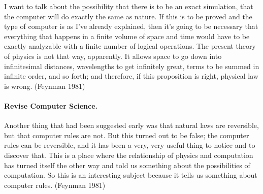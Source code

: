 \documentclass{article}
\newcommand{\jc}[1]{\fbox{Jacques says:} \textbf{#1}}
\begin{document}

I want to talk about the possibility that there is to be an exact
simulation, that the computer will do exactly the same as nature. If
this is to be proved and the type of computer is as I've already
explained, then it's going to be necessary that everything that
happens in a finite volume of space and time would have to be exactly
analyzable with a finite number of logical operations. The present
theory of physics is not that way, apparently. It allows space to go
down into infinitesimal distances, wavelengths to get infinitely
great, terms to be summed in infinite order, and so forth; and
therefore, if this proposition is right, physical law is wrong.
(Feynman 1981)


\paragraph*{Revise Computer Science.}

Another thing that had been suggested early was that natural laws are
reversible, but that computer rules are not. But this turned out to be
false; the computer rules can be reversible, and it has been a very,
very useful thing to notice and to discover that. This is a place
where the relationship of physics and computation has turned itself
the other way and told us something about the possibilities of
computation. So this is an interesting subject because it tells us
something about computer rules.  (Feynman 1981)
\end{document}
